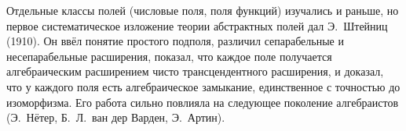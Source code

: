 \begin{aside}
Отдельные классы полей (числовые поля, поля функций) изучались и раньше, но первое систематическое изложение теории
абстрактных полей дал Э.~Штейниц (1910). Он ввёл понятие простого подполя,
различил сепарабельные и несепарабельные расширения, показал, что каждое поле получается алгебраическим расширением
чисто трансцендентного расширения, и доказал, что у каждого поля есть алгебраическое замыкание, единственное с точностью
до изоморфизма. Его работа сильно повлияла на следующее поколение алгебраистов (Э.~Нётер, Б.~Л.~ван дер Варден, Э.~Артин).
\end{aside}

